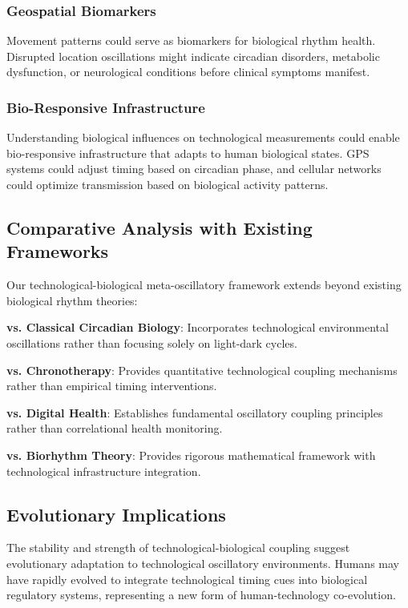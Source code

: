 \documentclass[12pt]{article}
\begin{document}
\subsubsection{Geospatial Biomarkers}
Movement patterns could serve as biomarkers for biological rhythm health. Disrupted location oscillations might indicate circadian disorders, metabolic dysfunction, or neurological conditions before clinical symptoms manifest.

\subsubsection{Bio-Responsive Infrastructure}
Understanding biological influences on technological measurements could enable bio-responsive infrastructure that adapts to human biological states. GPS systems could adjust timing based on circadian phase, and cellular networks could optimize transmission based on biological activity patterns.

\subsection{Comparative Analysis with Existing Frameworks}

Our technological-biological meta-oscillatory framework extends beyond existing biological rhythm theories:

\textbf{vs. Classical Circadian Biology}: Incorporates technological environmental oscillations rather than focusing solely on light-dark cycles.

\textbf{vs. Chronotherapy}: Provides quantitative technological coupling mechanisms rather than empirical timing interventions.

\textbf{vs. Digital Health}: Establishes fundamental oscillatory coupling principles rather than correlational health monitoring.

\textbf{vs. Biorhythm Theory}: Provides rigorous mathematical framework with technological infrastructure integration.

\subsection{Evolutionary Implications}

The stability and strength of technological-biological coupling suggest evolutionary adaptation to technological oscillatory environments. Humans may have rapidly evolved to integrate technological timing cues into biological regulatory systems, representing a new form of human-technology co-evolution.
\end{document}
